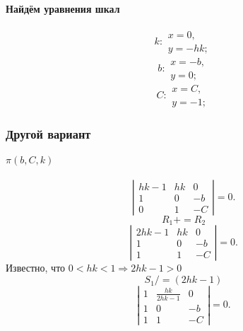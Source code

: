 \paragraph{Найдём уравнения шкал}
$$k:
\begin{array}{l}
	x = 0,\\
	y = -hk;
\end{array}
$$
$$b:
\begin{array}{l}
	x = -b,\\
	y = 0;
\end{array}
$$
$$C:
\begin{array}{l}
	x = C,\\
	y = -1;
\end{array}
$$

\subsubsection{Другой вариант}
\paragraph{$\pi(b, C, k)$}
$$
\left|
\begin{array}{lll}
	h k -1 & hk & 0 \\
	1      & 0  & -b \\
	0      & 1  & -C
\end{array}
\right|
=0.
$$
$$R_1 += R_2$$
$$
\left|
\begin{array}{lll}
	2 h k -1  & hk & 0 \\
	1         & 0  & -b \\
	1         & 1  & -C
\end{array}
\right|
=0.
$$
Известно, что $0<hk<1 \Rightarrow 2 h k -1 >0$
$$S_1 /= (2 h k -1)$$
$$
\left|
\begin{array}{lll}
	1 & \frac{hk}{2 h k -1} & 0 \\
	1               & 0 & -b \\
	1               & 1 & -C
\end{array}
\right|
=0.
$$
